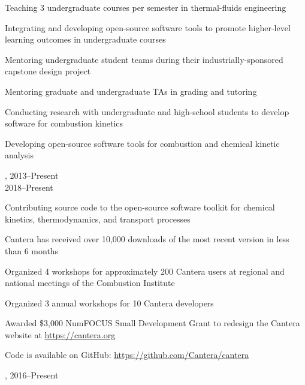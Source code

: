 \begin{innerlist}
    \item Teaching 3 undergraduate courses per semester in thermal-fluids engineering
    \item Integrating and developing open-source software tools to promote higher-level learning outcomes in undergraduate courses
    \item Mentoring undergraduate student teams during their industrially-sponsored capstone design project
    \item Mentoring graduate and undergraduate TAs in grading and tutoring
    \item Conducting research with undergraduate and high-school students to develop software for combustion kinetics
    \item Developing open-source software tools for combustion and chemical kinetic analysis
\end{innerlist}

\vspace{\baselineskip}

,  \hfill 2013--Present\\
 \hfill 2018--Present

\begin{innerlist}
    \item Contributing source code to the open-source software toolkit for chemical kinetics, thermodynamics, and transport processes
    \item Cantera has received over 10,000 downloads of the most recent version in less than 6 months
    \item Organized 4 workshops for approximately 200 Cantera users at regional and national meetings of the Combustion Institute
    \item Organized 3 annual workshops for 10 Cantera developers
    \item Awarded \$3,000 NumFOCUS Small Development Grant to redesign the Cantera website at \url{https://cantera.org}
    \item Code is available on GitHub: \url{https://github.com/Cantera/cantera}
\end{innerlist}

\vspace{\baselineskip}

,  \hfill 2016--Present

